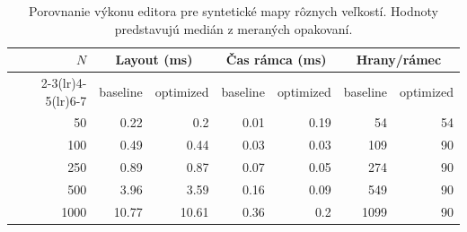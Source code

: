 \begin{table}[htbp]
\centering
\caption{Porovnanie výkonu editora pre syntetické mapy rôznych veľkostí. Hodnoty predstavujú medián z meraných opakovaní.}
\label{tab:nodify-performance}
\begin{tabular}{rrrrrrr}
\toprule
$N$ & \multicolumn{2}{c}{Layout (ms)} & \multicolumn{2}{c}{Čas rámca (ms)} & \multicolumn{2}{c}{Hrany/rámec} \\
\cmidrule(lr){2-3}\cmidrule(lr){4-5}\cmidrule(lr){6-7}
 & baseline & optimized & baseline & optimized & baseline & optimized \\
\midrule
50 & 0.22 & 0.2 & 0.01 & 0.19 & 54 & 54 \\
100 & 0.49 & 0.44 & 0.03 & 0.03 & 109 & 90 \\
250 & 0.89 & 0.87 & 0.07 & 0.05 & 274 & 90 \\
500 & 3.96 & 3.59 & 0.16 & 0.09 & 549 & 90 \\
1000 & 10.77 & 10.61 & 0.36 & 0.2 & 1099 & 90 \\
\bottomrule
\end{tabular}
\end{table}
